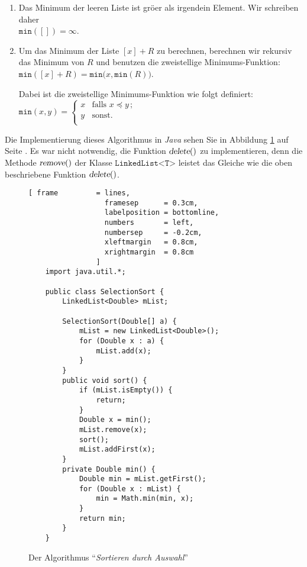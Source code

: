 \begin{enumerate}
\item Das Minimum der leeren Liste ist gr\"o\3er als irgendein Element.  Wir schreiben daher \\[0.2cm]
      \hspace*{1.3cm} $\mathtt{min}([]) = \infty$.
\item Um das Minimum der Liste $[x] + R$ zu berechnen, berechnen wir rekursiv das Minimum
      von $R$ und benutzen die zweistellige Minimums-Funktion: \\[0.2cm]
      \hspace*{1.3cm} 
      $\mathtt{min}([x] + R) = \mathtt{min}\bigl(x, \mathtt{min}(R) \bigr)$. 

      Dabei ist die zweistellige Minimums-Funktion wie folgt definiert: \\[0.2cm]
      \hspace*{1.3cm} 
      $\mathtt{min}(x,y) = \left\{
      \begin{array}{ll}
        x  & \mbox{falls $x \preceq y\,$;} \\
        y  & \mbox{sonst.} \\
      \end{array}\right.
      $
\end{enumerate}
Die Implementierung dieses Algorithmus in \textsl{Java} sehen Sie in Abbildung
\ref{fig:selection-sort} auf Seite \pageref{fig:selection-sort}.  Es war nicht notwendig,
die Funktion $\textsl{delete}()$ zu implementieren, denn die Methode $\textsl{remove}()$
der Klasse $\texttt{LinkedList<T>}$ leistet das Gleiche wie die oben beschriebene Funktion
$\textsl{delete}()$.

\begin{figure}[!ht]
  \centering
\begin{Verbatim}[ frame         = lines, 
                  framesep      = 0.3cm, 
                  labelposition = bottomline,
                  numbers       = left,
                  numbersep     = -0.2cm,
                  xleftmargin   = 0.8cm,
                  xrightmargin  = 0.8cm
                ]
    import java.util.*;
    
    public class SelectionSort {
        LinkedList<Double> mList;
        
        SelectionSort(Double[] a) {
            mList = new LinkedList<Double>();
            for (Double x : a) {
                mList.add(x);
            }
        }
        public void sort() {
            if (mList.isEmpty()) {
                return;
            }
            Double x = min();
            mList.remove(x);
            sort();
            mList.addFirst(x);
        }    
        private Double min() {
            Double min = mList.getFirst();
            for (Double x : mList) {
                min = Math.min(min, x);
            }
            return min;
        }
    }
\end{Verbatim}
\vspace*{-0.3cm}
  \caption{Der Algorithmus ``\emph{Sortieren durch Auswahl}''}
  \label{fig:selection-sort}
\end{figure}


